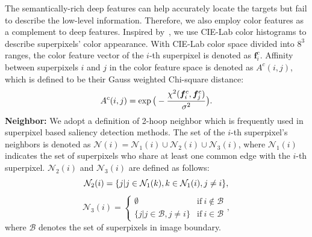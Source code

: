 \documentclass[journal]{IEEEtran}
\newcommand{\etal}{\mbox{\emph{et al.\ }}}
\begin{document}
The semantically-rich deep features can help accurately locate the targets but fail to describe the low-level information. Therefore, we also employ color features as a complement to deep features. Inspired by~\cite{Jiang2013Saliency}, we use CIE-Lab color histograms to describe superpixels' color appearance. With CIE-Lab color space divided into $8^3$ ranges, the color feature vector of the $i$-th superpixel is denoted as $\boldsymbol{f}_i^c$.
Affinity between superpixels $i$ and $j$ in the color feature space is denoted as $A^c(i,j)$, which is defined to be their Gauss weighted Chi-square distance:
\begin{equation}
\setlength{\abovedisplayskip}{2pt}
\setlength{\belowdisplayskip}{2pt}
A^c(i, j) = \exp \big( -\frac{\chi^2(\boldsymbol{f}_i^c,\boldsymbol{f}_j^c )}{\sigma^2} \big). 
\end{equation}
\noindent\textbf{Neighbor:}
We adopt a definition of 2-hoop neighbor which is frequently used in superpixel based saliency detection methods. The set of the $i$-th superpixel's neighbors is denoted as $ \mathcal{N}(i) = \mathcal{N}_1(i) \cup \mathcal{N}_2(i) \cup \mathcal{N}_3(i)$, where $\mathcal{N}_1(i)$ indicates the set of superpixels who share at least one common edge with the $i$-th superpixel. $\mathcal{N}_2(i)$ and $\mathcal{N}_3(i)$ are defined as follows: 
\begin{equation}
\setlength{\abovedisplayskip}{2pt}
\setlength{\belowdisplayskip}{2pt}
\mathcal{N}_2(i) = \{j | j \in \mathcal{N}_1(k), k \in \mathcal{N}_1(i), j \ne i\},
\end{equation}
\begin{equation}
\mathcal{N}_3(i) =
\begin{cases}
\emptyset &\mbox{if}~i \notin \mathcal{B}\\
\{j | j \in \mathcal{B}, j \ne i\} &\mbox{if}~i \in \mathcal{B}
\end{cases},
\end{equation}
where $\mathcal{B}$ denotes the set of superpixels in image boundary. 
\end{document}
